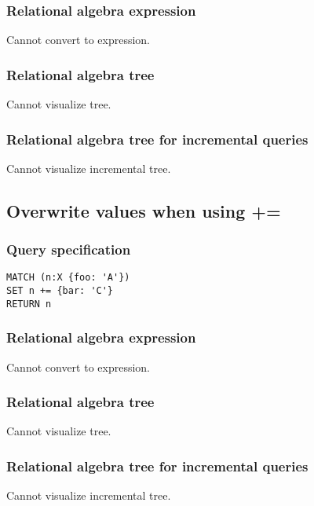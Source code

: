 \subsubsection*{Relational algebra expression}

Cannot convert to expression.

\subsubsection*{Relational algebra tree}

Cannot visualize tree.

\subsubsection*{Relational algebra tree for incremental queries}

Cannot visualize incremental tree.

\subsection{Overwrite values when using +=}

\subsubsection*{Query specification}

\begin{lstlisting}
MATCH (n:X {foo: 'A'})
SET n += {bar: 'C'}
RETURN n
\end{lstlisting}

\subsubsection*{Relational algebra expression}

Cannot convert to expression.

\subsubsection*{Relational algebra tree}

Cannot visualize tree.

\subsubsection*{Relational algebra tree for incremental queries}

Cannot visualize incremental tree.


